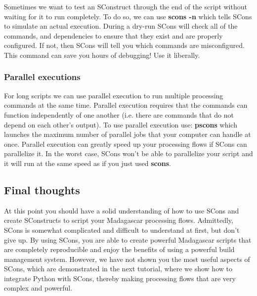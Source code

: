 Sometimes we want to test an SConstruct through the end of the script without waiting for it to run completely.  To do so, we can use \textbf{scons -n} which tells SCons to simulate an actual execution. During a dry-run SCons will check all of the commands, and dependencies to ensure that they exist and are properly configured.  If not, then SCons will tell you which commands are misconfigured.  This command can save you hours of debugging!  Use it liberally.

\subsubsection{Parallel executions}

For long scripts we can use parallel execution to run multiple processing commands at the same time.  Parallel execution requires that the commands can function independently of one another (i.e. there are commands that do not depend on each other's output).  To use parallel execution use: \textbf{pscons} which launches the maximum number of parallel jobs that your computer can handle at once.  Parallel execution can greatly speed up your processing flows if SCons can parallelize it.  In the worst case, SCons won't be able to parallelize your script and it will run at the same speed as if you just used \textbf{scons}.

\subsection{Final thoughts}

At this point you should have a solid understanding of how to use SCons and create SConstructs to script your Madagascar processing flows.  Admittedly, SCons is somewhat complicated and difficult to understand at first, but don't give up.  By using SCons, you are able to create powerful Madagascar scripts that are completely reproducible and enjoy the benefits of using a powerful build management system.  However, we have not shown you the most useful aspects of SCons, which are demonstrated in the next tutorial, where we show how to integrate Python with SCons, thereby making processing flows that are very complex and powerful.
 
